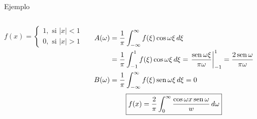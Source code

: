 \documentclass[9pt, aspectratio=169]{beamer}
\begin{document}
\begin{frame}{Ejemplo}
\begin{columns}[c]
\cx
\[ f(x) =
    \begin{cases}
    1, \text{ si } |x| < 1 \\
    0, \text{ si } |x| > 1 
    \end{cases} 
\]

\begin{align*}
    A(\omega) &= \frac{1}{\pi} \int_{-\infty}^{\infty} f(\xi) \cos \omega \xi \, d\xi \\
              &= \frac{1}{\pi} \int_{-1}^{1} f(\xi) \cos \omega \xi \, d\xi = \left. \frac{\operatorname{sen} \omega \xi}{\pi \omega} \right|_{-1}^1 = \frac{2 \operatorname{sen} \omega}{\pi \omega} \\
    B(\omega) &= \frac{1}{\pi} \int_{-\infty}^{\infty} f(\xi) \operatorname{sen} \omega \xi \, d\xi = 0 
\end{align*}
\[    \boxed{ f(x) = \frac{2}{\pi} \int_0^{\infty} \frac{\cos \omega x \operatorname{sen} \omega}{w} \, d\omega } \]
\cx
\begin{center}
    \includegraphics[scale=0.45]{figs/fig-02.pdf}
\end{center}
\end{columns}
\end{frame}
\end{document}
